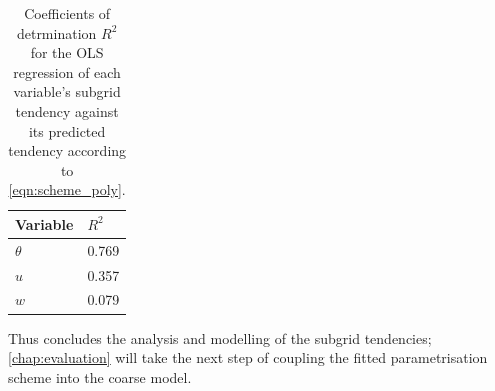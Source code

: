 \documentclass[../main.tex]{subfiles}
\begin{document}
\begin{table}[ht]
\centering
\begin{tabular}{l l}
    \toprule
    Variable & $R^2$ \\
    \midrule
    $\theta$ & 0.769 \\
    $u$ & 0.357 \\
    $w$ & 0.079 \\
    \bottomrule
\end{tabular}
\caption{
    Coefficients of detrmination $R^2$ for the OLS regression of each
    variable's subgrid tendency against its predicted tendency according to
    \cref{eqn:scheme_poly}.
}
\label{tab:r_squared}
\end{table}

Thus concludes the analysis and modelling of the subgrid tendencies;
\cref{chap:evaluation} will take the next step of coupling the fitted
parametrisation scheme into the coarse model.


\ifSubfilesClassLoaded{%
    \emergencystretch=5em
    \printbibliography{}
}{}
\end{document}
